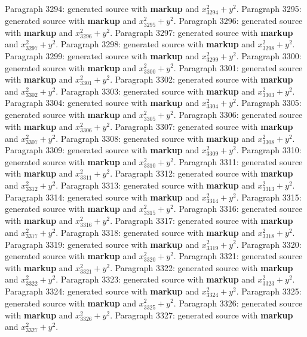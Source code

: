 \documentclass{article}
\begin{document}
Paragraph 3294: generated source with \textbf{markup} and $x_{3294}^2 + y^2$.
Paragraph 3295: generated source with \textbf{markup} and $x_{3295}^2 + y^2$.
Paragraph 3296: generated source with \textbf{markup} and $x_{3296}^2 + y^2$.
Paragraph 3297: generated source with \textbf{markup} and $x_{3297}^2 + y^2$.
Paragraph 3298: generated source with \textbf{markup} and $x_{3298}^2 + y^2$.
Paragraph 3299: generated source with \textbf{markup} and $x_{3299}^2 + y^2$.
Paragraph 3300: generated source with \textbf{markup} and $x_{3300}^2 + y^2$.
Paragraph 3301: generated source with \textbf{markup} and $x_{3301}^2 + y^2$.
Paragraph 3302: generated source with \textbf{markup} and $x_{3302}^2 + y^2$.
Paragraph 3303: generated source with \textbf{markup} and $x_{3303}^2 + y^2$.
Paragraph 3304: generated source with \textbf{markup} and $x_{3304}^2 + y^2$.
Paragraph 3305: generated source with \textbf{markup} and $x_{3305}^2 + y^2$.
Paragraph 3306: generated source with \textbf{markup} and $x_{3306}^2 + y^2$.
Paragraph 3307: generated source with \textbf{markup} and $x_{3307}^2 + y^2$.
Paragraph 3308: generated source with \textbf{markup} and $x_{3308}^2 + y^2$.
Paragraph 3309: generated source with \textbf{markup} and $x_{3309}^2 + y^2$.
Paragraph 3310: generated source with \textbf{markup} and $x_{3310}^2 + y^2$.
Paragraph 3311: generated source with \textbf{markup} and $x_{3311}^2 + y^2$.
Paragraph 3312: generated source with \textbf{markup} and $x_{3312}^2 + y^2$.
Paragraph 3313: generated source with \textbf{markup} and $x_{3313}^2 + y^2$.
Paragraph 3314: generated source with \textbf{markup} and $x_{3314}^2 + y^2$.
Paragraph 3315: generated source with \textbf{markup} and $x_{3315}^2 + y^2$.
Paragraph 3316: generated source with \textbf{markup} and $x_{3316}^2 + y^2$.
Paragraph 3317: generated source with \textbf{markup} and $x_{3317}^2 + y^2$.
Paragraph 3318: generated source with \textbf{markup} and $x_{3318}^2 + y^2$.
Paragraph 3319: generated source with \textbf{markup} and $x_{3319}^2 + y^2$.
Paragraph 3320: generated source with \textbf{markup} and $x_{3320}^2 + y^2$.
Paragraph 3321: generated source with \textbf{markup} and $x_{3321}^2 + y^2$.
Paragraph 3322: generated source with \textbf{markup} and $x_{3322}^2 + y^2$.
Paragraph 3323: generated source with \textbf{markup} and $x_{3323}^2 + y^2$.
Paragraph 3324: generated source with \textbf{markup} and $x_{3324}^2 + y^2$.
Paragraph 3325: generated source with \textbf{markup} and $x_{3325}^2 + y^2$.
Paragraph 3326: generated source with \textbf{markup} and $x_{3326}^2 + y^2$.
Paragraph 3327: generated source with \textbf{markup} and $x_{3327}^2 + y^2$.
\end{document}
